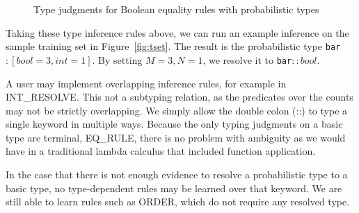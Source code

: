 {
\setlength{\abovecaptionskip}{-.05pt}
\setlength{\belowcaptionskip}{-15pt}
\begin{figure}
\caption{Type judgments for Boolean equality rules with probabilistic types}
\label{fig:ptypes}
\end{figure}
}

Taking these type inference rules above, we can run an example inference on the sample training set in Figure~\ref{fig:tset}. The result is the probabilistic type \texttt{bar}$:[bool=3,int=1]$. By setting $M=3, N=1$, we resolve it to \texttt{bar}$::bool$.

 
A user may implement overlapping inference rules, for example in {\scriptsize INT\_RESOLVE}.
This not a subtyping relation, as the predicates over the counts may not be strictly overlapping.
We simply allow the double colon (::) to type a single keyword in multiple ways.
Because the only typing judgments on a basic type are terminal, {\scriptsize EQ\_RULE}, there is no problem with ambiguity as we would have in a traditional lambda calculus that included function application.


In the case that there is not enough evidence to resolve a probabilistic type to a basic type, no type-dependent rules may be learned over that keyword.
We are still able to learn rules such as {\scriptsize ORDER}, which do not require any resolved type. 


